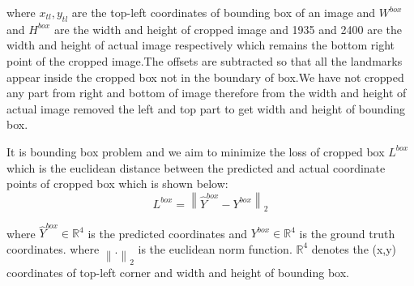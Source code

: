 \documentclass[sn-mathphys]{sn-jnl}%
\theoremstyle{thmstyleone}%
\theoremstyle{thmstyletwo}%
\theoremstyle{thmstylethree}%
\begin{document}
where  \begin{math}x_{tl},y_{tl} \end{math} are the top-left coordinates of bounding box of an image and \begin{math}W^{box}\end{math} and \begin{math} H^{box} \end{math}  are  the width and height of cropped image and  1935 and 2400 are the width and height of actual image respectively which remains the bottom right point of the cropped image.The offsets are subtracted so that all the landmarks appear inside the cropped box not in the boundary of box.We have not cropped any part from right  and bottom of image therefore from the width and height of actual image removed the left and top part to get width and height of bounding box.


\par It is bounding box problem and we aim to minimize the loss of cropped box \begin{math} L^{box} \end{math} which is  the euclidean distance between the predicted and actual coordinate points of cropped box which is shown below:
\begin{equation}
    L^{box} = \left \| \hat{Y}^{box} - Y^{box} \right \|_{2}
\end{equation}

where \begin{math} \hat{Y}^{box} \in \mathbb{R}^{4} \end{math} is the predicted coordinates  and \begin{math} Y^{box} \in \mathbb{R}^{4} \end{math}  is the ground truth coordinates. where \begin{math} \left \| . \right \|_{2} \end{math} is the euclidean norm function. \begin{math}  \mathbb{R}^{4} \end{math} denotes the (x,y) coordinates of top-left corner  and width and height of bounding box.
\end{document}
